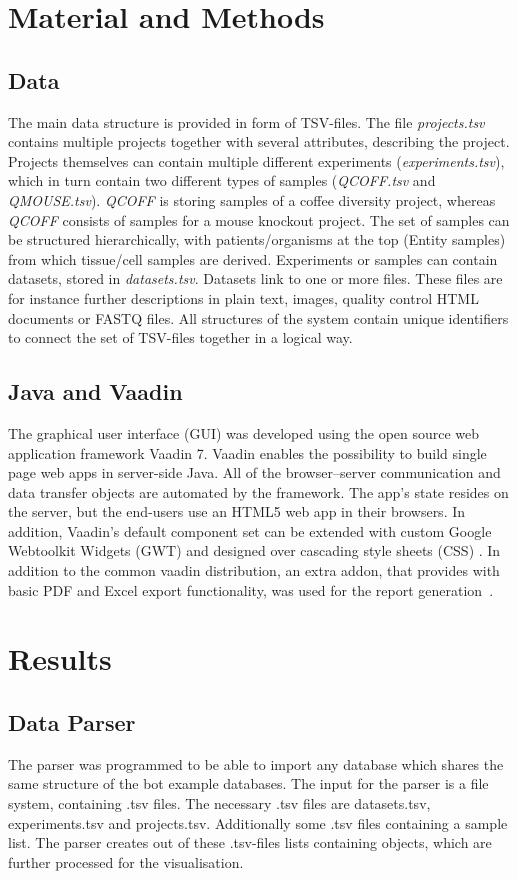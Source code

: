 \documentclass[a4paper, 11pt]{article}
\begin{document}
\section{Material and Methods}
\subsection{Data}
The main data structure is provided in form of TSV-files. The file \emph{projects.tsv} contains multiple projects together with several attributes, describing the project. Projects themselves can contain multiple different experiments (\emph{experiments.tsv}), which in turn contain two different types of samples (\emph{QCOFF.tsv} and \emph{QMOUSE.tsv}). \emph{QCOFF} is storing samples of a coffee diversity project, whereas \emph{QCOFF} consists of samples for a mouse knockout project. The set of samples can be structured hierarchically, with patients/organisms at the top (Entity samples) from which tissue/cell samples are derived. Experiments or samples can contain datasets, stored in \emph{datasets.tsv}. Datasets link to one or more files. These files are for instance further descriptions in plain text, images, quality control HTML documents or FASTQ files. All structures of the system contain unique identifiers to connect the set of TSV-files together in a logical way.
\subsection{Java and Vaadin}
The graphical user interface (GUI) was developed using the open source web application framework Vaadin 7. Vaadin enables the possibility to build single page web apps in server-side Java. All of the browser–server communication and data transfer objects are automated by the framework. The app's state resides on the server, but the end-users use an HTML5 web app in their browsers. In addition, Vaadin's default component set can be extended with custom Google Webtoolkit Widgets (GWT) and designed over cascading style sheets (CSS) \cite{Vaadin}. In addition to the common vaadin distribution, an extra addon, that provides with basic PDF and Excel export functionality, was used for the report generation~\cite{addon}.  
\section{Results}
\subsection{Data Parser}
The parser was programmed to be able to import any database which shares the same structure of the bot example databases. The input for the parser is a file system, containing .tsv files. The necessary .tsv files are datasets.tsv, experiments.tsv and projects.tsv. Additionally some .tsv files containing a sample list. The parser creates out of these .tsv-files lists containing objects, which are further processed for the visualisation.
\end{document}
